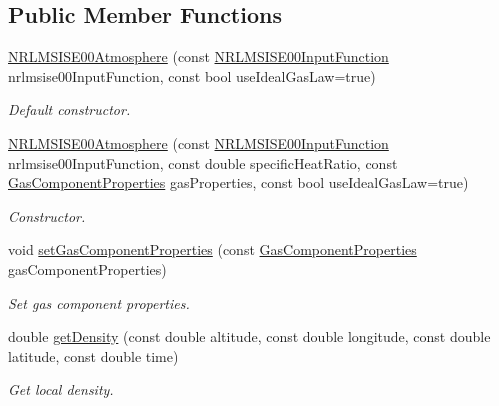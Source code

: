 \subsection*{Public Member Functions}
\begin{DoxyCompactItemize}
\item 
\hyperlink{classtudat_1_1aerodynamics_1_1NRLMSISE00Atmosphere_a83ec6d0bb41bd6cd34dd16ac5a408195}{N\+R\+L\+M\+S\+I\+S\+E00\+Atmosphere} (const \hyperlink{classtudat_1_1aerodynamics_1_1NRLMSISE00Atmosphere_aee0e57056d5fc68264773dd94b8b8f3b}{N\+R\+L\+M\+S\+I\+S\+E00\+Input\+Function} nrlmsise00\+Input\+Function, const bool use\+Ideal\+Gas\+Law=true)
\begin{DoxyCompactList}\small\item\em Default constructor. \end{DoxyCompactList}\item 
\hyperlink{classtudat_1_1aerodynamics_1_1NRLMSISE00Atmosphere_af30909b7ca9b2e925a6c62c148226df5}{N\+R\+L\+M\+S\+I\+S\+E00\+Atmosphere} (const \hyperlink{classtudat_1_1aerodynamics_1_1NRLMSISE00Atmosphere_aee0e57056d5fc68264773dd94b8b8f3b}{N\+R\+L\+M\+S\+I\+S\+E00\+Input\+Function} nrlmsise00\+Input\+Function, const double specific\+Heat\+Ratio, const \hyperlink{structtudat_1_1aerodynamics_1_1GasComponentProperties}{Gas\+Component\+Properties} gas\+Properties, const bool use\+Ideal\+Gas\+Law=true)
\begin{DoxyCompactList}\small\item\em Constructor. \end{DoxyCompactList}\item 
void \hyperlink{classtudat_1_1aerodynamics_1_1NRLMSISE00Atmosphere_a9c4cfe9a72d0e00b1746d85849e9e61c}{set\+Gas\+Component\+Properties} (const \hyperlink{structtudat_1_1aerodynamics_1_1GasComponentProperties}{Gas\+Component\+Properties} gas\+Component\+Properties)
\begin{DoxyCompactList}\small\item\em Set gas component properties. \end{DoxyCompactList}\item 
double \hyperlink{classtudat_1_1aerodynamics_1_1NRLMSISE00Atmosphere_a47aa6bc2a6782701055d74ef26ef2652}{get\+Density} (const double altitude, const double longitude, const double latitude, const double time)
\begin{DoxyCompactList}\small\item\em Get local density. \end{DoxyCompactList}\item 

\end{DoxyCompactItemize}
